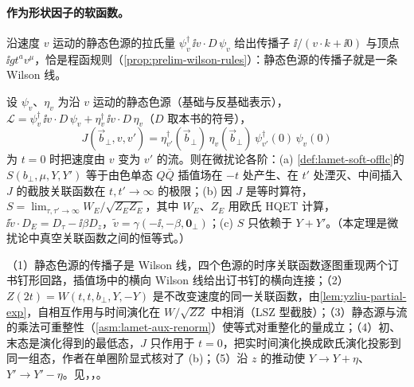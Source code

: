 \paragraph{作为形状因子的软函数。}沿速度 $v$ 运动的静态色源的拉氏量 $\psi_v^\dagger\,\ii v\cdot D\,\psi_v$ 给出传播子 $\ii/(v\cdot k+\ii0)$ 与顶点 $\ii gt^av^\mu$，恰是程函规则（\cref{prop:prelim-wilson-rules}）：静态色源的传播子就是一条 Wilson 线。

\begin{theorem}\label{thm:yzliu-soft-hqet}
设 $\psi_v$、$\eta_v$ 为沿 $v$ 运动的静态色源（基础与反基础表示），$\mathcal L=\psi_v^\dagger\,\ii v\cdot D\,\psi_v+\eta_v^\dagger\,\ii v\cdot D\,\eta_v$（$D$ 取本书的符号），
\begin{equation}\label{eq:yzliu-hqet-J}
J(\vec b_\perp,v,v')=\eta^\dagger_{v'}(\vec b_\perp)\,\eta_v(\vec b_\perp)\,\psi^\dagger_{v'}(0)\,\psi_v(0)
\end{equation}
为 $t=0$ 时把速度由 $v$ 变为 $v'$ 的流。则在微扰论各阶：(a) \cref{def:lamet-soft-offlc}的 $S(b_\perp,\mu,Y,Y')$ 等于由色单态 $Q\bar Q$ 插值场在 $-t$ 处产生、在 $t'$ 处湮灭、中间插入 $J$ 的截肢关联函数在 $t,t'\to\infty$ 的极限；(b) 因 $J$ 是等时算符，$S=\lim_{\tau,\tau'\to\infty}W_E/\sqrt{Z_EZ_E}$，其中 $W_E$、$Z_E$ 用欧氏 HQET 计算，$\ii\tilde v\cdot D_E=D_\tau-\ii\beta D_z$，$\tilde v=\gamma(-\ii,-\beta,\mathbf 0_\perp)$；(c) $S$ 只依赖于 $Y+Y'$。（本定理是微扰论中真空关联函数之间的恒等式。）%
\end{theorem}

\begin{proofsketch}
（1）静态色源的传播子是 Wilson 线，四个色源的时序关联函数逐图重现两个订书钉形回路，插值场中的横向 Wilson 线给出订书钉的横向连接；（2）$Z(2t)=W(t,t,b_\perp,Y,-Y)$ 是不改变速度的同一关联函数，由\cref{lem:yzliu-partial-exp}，自相互作用与时间演化在 $W/\sqrt{ZZ}$ 中相消（LSZ 型截肢）；（3）静态源与流的乘法可重整性（\cref{asm:lamet-aux-renorm}）使等式对重整化的量成立；（4）初、末态是演化得到的最低态，$J$ 只作用于 $t=0$，把实时间演化换成欧氏演化投影到同一组态，作者在单圈阶显式核对了 (b)\cite[式~(12)--(13)]{Ji:2019sxk}；（5）沿 $z$ 的推动使 $Y\to Y+\eta$、$Y'\to Y'-\eta$。见\cite[式~(1)--(13)]{Ji:2019sxk}，\cite[第~4.1--4.2~节、附录~A]{Liu:2022nnk}，\cite[第~V.C~节]{JiEtAl2021}。
\end{proofsketch}

